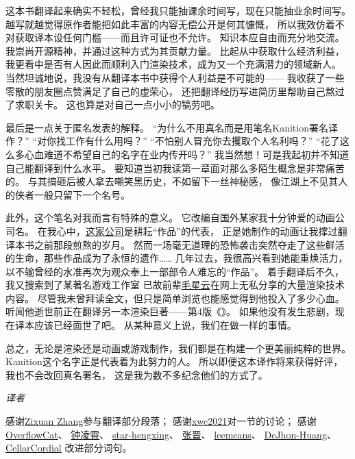 这本书翻译起来确实不轻松，曾经我只能抽课余时间写，现在只能抽业余时间写。
越写就越觉得原作者能把如此丰富的内容无偿公开是何其慷慨，
所以我效仿着不对获取译本设任何门槛——而且许可证也不允许。
知识本应自由而充分地交流。我崇尚开源精神，并通过这种方式为其贡献力量。
比起从中获取什么经济利益，我更看中是否有人因此而顺利入门渲染技术，成为又一个充满潜力的领域新人。
当然坦诚地说，我没有从翻译本书中获得个人利益是不可能的——
我收获了一些零散的朋友圈点赞满足了自己的虚荣心，
还把翻译经历写进简历里帮助自己熬过了求职关卡。
这也算是对自己一点小小的犒劳吧。

最后是一点关于匿名发表的解释。
“为什么不用真名而是用笔名Kanition署名译作？”
“对你找工作有什么用吗？”
“不怕别人冒充你去攫取个人名利吗？”
“花了这么多心血难道不希望自己的名字在业内传开吗？”
我当然想！可是我起初并不知道自己能翻译到什么水平。
要知道当初我读第一章面对那么多陌生概念是非常痛苦的。
与其搞砸后被人拿去嘲笑黑历史，不如留下一丝神秘感，
像江湖上不见其人的侠者一般只留下一个名号。

此外，这个笔名对我而言有特殊的意义。
它改编自国外某家我十分钟爱的动画公司名。
在我心中，\href{https://www.kyotoanimation.co.jp/}{这家公司}是耕耘“作品”的代表，
正是她制作的动画让我撑过翻译本书之前那段煎熬的岁月。
然而一场毫无道理的恐怖袭击突然夺走了这些鲜活的生命，那些作品成为了永恒的遗作……
几年过去，我很高兴看到她能重焕活力，以不输曾经的水准再次为观众奉上一部部令人难忘的“作品”。
着手翻译后不久，我又搜索到了某著名游戏工作室
已故前辈\href{https://github.com/QianMo}{毛星云}在网上无私分享的大量渲染技术内容。
尽管我未曾拜读全文，但只是简单浏览也能感觉得到他投入了多少心血。
听闻他逝世前正在翻译另一本渲染巨著——第4版《》。
如果他没有发生悲剧，现在译本应该已经面世了吧。
从某种意义上说，我们在做一样的事情。

总之，无论是渲染还是动画或游戏制作，我们都是在构建一个更美丽纯粹的世界。
Kanition这个名字正是代表着为此努力的人。
所以即便这本译作将来获得好评，我也不会改回真名署名，
这是我为数不多纪念他们的方式了。

\vspace{15pt}
{\hfill {\itshape 译者}\quad{}\qquad}

\vspace{15pt}

感谢\href{https://zixuan-zhang.com}{Zixuan Zhang}参与翻译部分段落；
感谢\href{https://github.com/xwc2021}{xwc2021}对一节的讨论；
感谢\href{https://github.com/OverflowCat}{OverflowCat}、
\href{https://www.zhihu.com/people/zhong-ling-xiao}{钟凌霄}、
\href{https://github.com/star-hengxing}{star-hengxing}、
\href{https://theigrams.github.io/}{张晋}、
\href{https://github.com/leemeans}{leemeans}、
\href{https://www.zhihu.com/people/itact/posts}{DeJhon-Huang}、
\href{https://github.com/CellarCordial}{CellarCordial}
改进部分词句。